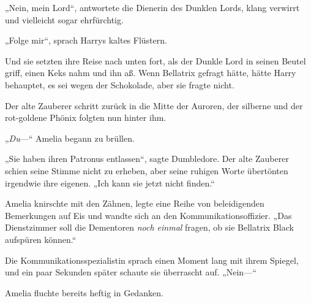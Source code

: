 „Nein, mein Lord“, antwortete die Dienerin des Dunklen Lords, klang verwirrt und vielleicht sogar ehrfürchtig.

„Folge mir“, sprach Harrys kaltes Flüstern.

Und sie setzten ihre Reise nach unten fort, als der Dunkle Lord in seinen Beutel griff, einen Keks nahm und ihn aß. Wenn Bellatrix gefragt hätte, hätte Harry behauptet, es sei wegen der Schokolade, aber sie fragte nicht.

\later

Der alte Zauberer schritt zurück in die Mitte der Auroren, der silberne und der rot-goldene Phönix folgten nun hinter ihm.

„\emph{Du}—“ Amelia begann zu brüllen.

„Sie haben ihren Patronus entlassen“, sagte Dumbledore. Der alte Zauberer schien seine Stimme nicht zu erheben, aber seine ruhigen Worte übertönten irgendwie ihre eigenen. „Ich kann sie jetzt nicht finden.“

Amelia knirschte mit den Zähnen, legte eine Reihe von beleidigenden Bemerkungen auf Eis und wandte sich an den Kommunikationsoffizier. „Das Dienstzimmer soll die Dementoren \emph{noch einmal} fragen, ob sie Bellatrix Black aufspüren können.“

Die Kommunikationsspezialistin sprach einen Moment lang mit ihrem Spiegel, und ein paar Sekunden später schaute sie überrascht auf. „Nein—“

Amelia fluchte bereits heftig in Gedanken.

